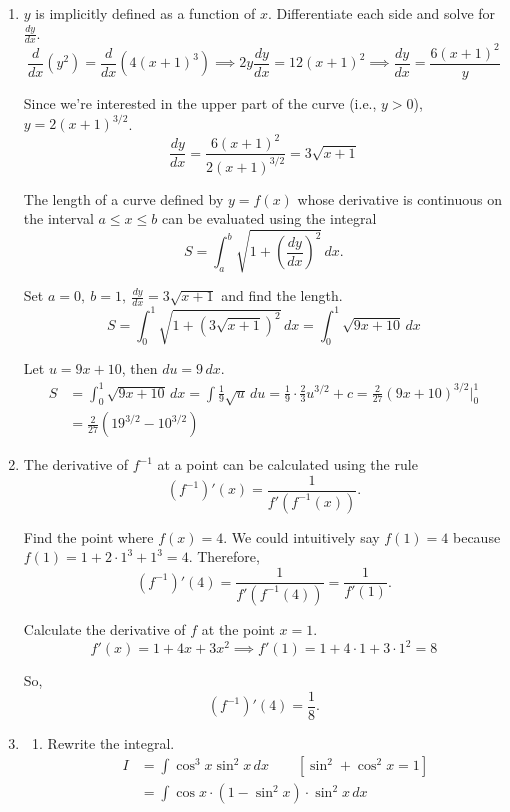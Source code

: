\documentclass[a4paper, 12pt]{article}
\begin{document}
\begin{enumerate}[leftmargin=*,label=\textbf{\arabic*.}]
\item $y$ is implicitly defined as a function of $x$. Differentiate each side and solve for $\displaystyle \frac{dy}{dx}$.
\[\frac d{dx}\left(y^2\right)=\frac d{dx}\left(4(x+1)^3\right)\implies 2y\frac{dy}{dx}=12(x+1)^2\implies\frac{dy}{dx}=\frac{6(x+1)^2}y\]

Since we're interested in the upper part of the curve (i.e., $y>0$), $y=2(x+1)^{3/2}$.
\[\frac{dy}{dx}=\frac{6(x+1)^2}{2(x+1)^{3/2}}=3\sqrt{x+1}\]

The length of a curve defined by $y=f(x)$ whose derivative is continuous on the interval $a\leq x\leq b$ can be evaluated using the integral
\[S=\int_a^b\sqrt{1+\left(\frac{dy}{dx}\right)^2}\,dx.\]

Set $\displaystyle a=0,\:b=1,\:\frac{dy}{dx}=3\sqrt{x+1}$ and find the length.
\[S=\int_0^1\sqrt{1+\left(3\sqrt{x+1}\right)^2}\,dx=\int_0^1\sqrt{9x+10}\,dx\]

Let $u=9x+10$, then $du=9\,dx$.
\begin{align*}
S&=\int_0^1\sqrt{9x+10}\,dx=\int\frac19\sqrt{u}\,du=\frac19\cdot\frac23u^{3/2}+c=\frac2{27}\left(9x+10\right)^{3/2}\bigg|_0^1\\[1em]&=\boxed{\frac2{27}\left(19^{3/2}-10^{3/2}\right)}
\end{align*}

\item The derivative of $f^{-1}$ at a point can be calculated using the rule
\[\left(f^{-1}\right)'(x)=\frac1{f'\left(f^{-1}(x)\right)}.\]

Find the point where $f(x)=4$. We could intuitively say $f(1)=4$ because $f(1)=1+2\cdot1^3+1^3=4$. Therefore,
\[\left(f^{-1}\right)'\left(4\right)=\frac1{f'\left(f^{-1}(4)\right)}=\frac1{f'(1)}.\]

Calculate the derivative of $f$ at the point $x=1$.
\[f'(x)=1+4x+3x^2\implies f'(1)=1+4\cdot1+3\cdot1^2=8\]

So,
\[\left(f^{-1}\right)'\left(4\right)=\boxed{\frac18}.\]

\item \begin{enumerate}[leftmargin=*,label=\textbf{\alph*.}]
\item Rewrite the integral.
\begin{align*}
I&=\int\cos^3x\sin^2x\,dx\qquad\left[\sin^2+\cos^2x=1\right]\\[1em]&=\int\cos x\cdot\left(1-\sin^2x\right)\cdot\sin^2x\,dx
\end{align*}


\end{enumerate}
\end{enumerate}
\end{document}
